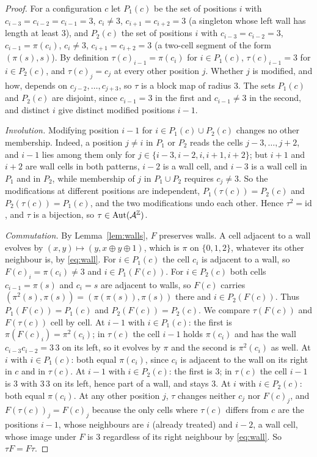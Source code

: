 \begin{proof}
For a configuration $c$ let $P_1(c)$ be the set of positions $i$ with $c_{i-3}=c_{i-2}=c_{i-1}=3$, $c_i\ne3$, $c_{i+1}=c_{i+2}=3$ (a singleton whose left wall has length at least $3$), and $P_2(c)$ the set of positions $i$ with $c_{i-3}=c_{i-2}=3$, $c_{i-1}=\pi(c_i)$, $c_i\ne3$, $c_{i+1}=c_{i+2}=3$ (a two-cell segment of the form $(\pi(s),s)$). By definition $\tau(c)_{i-1}=\pi(c_i)$ for $i\in P_1(c)$, $\tau(c)_{i-1}=3$ for $i\in P_2(c)$, and $\tau(c)_j=c_j$ at every other position $j$. Whether $j$ is modified, and how, depends on $c_{j-2},\dots,c_{j+3}$, so $\tau$ is a block map of radius $3$. The sets $P_1(c)$ and $P_2(c)$ are disjoint, since $c_{i-1}=3$ in the first and $c_{i-1}\ne3$ in the second, and distinct $i$ give distinct modified positions $i-1$.

\emph{Involution.} Modifying position $i-1$ for $i\in P_1(c)\cup P_2(c)$ changes no other membership. Indeed, a position $j\ne i$ in $P_1$ or $P_2$ reads the cells $j-3,\dots,j+2$, and $i-1$ lies among them only for $j\in\{i-3,i-2,i,i+1,i+2\}$; but $i+1$ and $i+2$ are wall cells in both patterns, $i-2$ is a wall cell, and $i-3$ is a wall cell in $P_1$ and in $P_2$, while membership of $j$ in $P_1\cup P_2$ requires $c_j\ne3$. So the modifications at different positions are independent, $P_1(\tau(c))=P_2(c)$ and $P_2(\tau(c))=P_1(c)$, and the two modifications undo each other. Hence $\tau^2=\mathrm{id}$, and $\tau$ is a bijection, so $\tau\in\operatorname{Aut}(\mathcal{A}^{\mathbb{Z}})$.

\emph{Commutation.} By Lemma~\ref{lem:walls}, $F$ preserves walls. A cell adjacent to a wall evolves by $(x,y)\mapsto(y,x\oplus y\oplus1)$, which is $\pi$ on $\{0,1,2\}$, whatever its other neighbour is, by \eqref{eq:wall}. For $i\in P_1(c)$ the cell $c_i$ is adjacent to a wall, so $F(c)_i=\pi(c_i)\ne3$ and $i\in P_1(F(c))$. For $i\in P_2(c)$ both cells $c_{i-1}=\pi(s)$ and $c_i=s$ are adjacent to walls, so $F(c)$ carries $(\pi^2(s),\pi(s))=(\pi(\pi(s)),\pi(s))$ there and $i\in P_2(F(c))$. Thus $P_1(F(c))=P_1(c)$ and $P_2(F(c))=P_2(c)$. We compare $\tau(F(c))$ and $F(\tau(c))$ cell by cell. At $i-1$ with $i\in P_1(c)$: the first is $\pi(F(c)_i)=\pi^2(c_i)$; in $\tau(c)$ the cell $i-1$ holds $\pi(c_i)$ and has the wall $c_{i-3}c_{i-2}=3\,3$ on its left, so it evolves by $\pi$ and the second is $\pi^2(c_i)$ as well. At $i$ with $i\in P_1(c)$: both equal $\pi(c_i)$, since $c_i$ is adjacent to the wall on its right in $c$ and in $\tau(c)$. At $i-1$ with $i\in P_2(c)$: the first is $3$; in $\tau(c)$ the cell $i-1$ is $3$ with $3\,3$ on its left, hence part of a wall, and stays $3$. At $i$ with $i\in P_2(c)$: both equal $\pi(c_i)$. At any other position $j$, $\tau$ changes neither $c_j$ nor $F(c)_j$, and $F(\tau(c))_j=F(c)_j$ because the only cells where $\tau(c)$ differs from $c$ are the positions $i-1$, whose neighbours are $i$ (already treated) and $i-2$, a wall cell, whose image under $F$ is $3$ regardless of its right neighbour by \eqref{eq:wall}. So $\tau F=F\tau$.


\end{proof}
